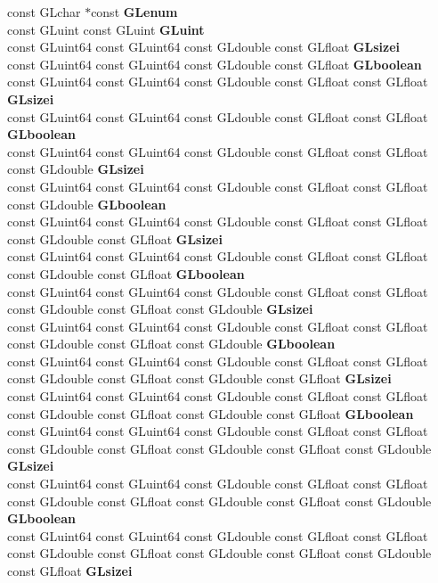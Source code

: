 \begin{DoxyCompactItemize}
\begin{tabbing}
\>const GLchar $\ast$const {\bfseries GLenum}\\
\>const GLuint const GLuint {\bfseries GLuint}\\
\>const GLuint64 const GLuint64 const GLdouble const GLfloat {\bfseries GLsizei}\\
\>const GLuint64 const GLuint64 const GLdouble const GLfloat {\bfseries GLboolean}\\
\>const GLuint64 const GLuint64 const GLdouble const GLfloat const GLfloat {\bfseries GLsizei}\\
\>const GLuint64 const GLuint64 const GLdouble const GLfloat const GLfloat {\bfseries GLboolean}\\
\>const GLuint64 const GLuint64 const GLdouble const GLfloat const GLfloat const GLdouble {\bfseries GLsizei}\\
\>const GLuint64 const GLuint64 const GLdouble const GLfloat const GLfloat const GLdouble {\bfseries GLboolean}\\
\>const GLuint64 const GLuint64 const GLdouble const GLfloat const GLfloat const GLdouble const GLfloat {\bfseries GLsizei}\\
\>const GLuint64 const GLuint64 const GLdouble const GLfloat const GLfloat const GLdouble const GLfloat {\bfseries GLboolean}\\
\>const GLuint64 const GLuint64 const GLdouble const GLfloat const GLfloat const GLdouble const GLfloat const GLdouble {\bfseries GLsizei}\\
\>const GLuint64 const GLuint64 const GLdouble const GLfloat const GLfloat const GLdouble const GLfloat const GLdouble {\bfseries GLboolean}\\
\>const GLuint64 const GLuint64 const GLdouble const GLfloat const GLfloat const GLdouble const GLfloat const GLdouble const GLfloat {\bfseries GLsizei}\\
\>const GLuint64 const GLuint64 const GLdouble const GLfloat const GLfloat const GLdouble const GLfloat const GLdouble const GLfloat {\bfseries GLboolean}\\
\>const GLuint64 const GLuint64 const GLdouble const GLfloat const GLfloat const GLdouble const GLfloat const GLdouble const GLfloat const GLdouble {\bfseries GLsizei}\\
\>const GLuint64 const GLuint64 const GLdouble const GLfloat const GLfloat const GLdouble const GLfloat const GLdouble const GLfloat const GLdouble {\bfseries GLboolean}\\
\>const GLuint64 const GLuint64 const GLdouble const GLfloat const GLfloat const GLdouble const GLfloat const GLdouble const GLfloat const GLdouble const GLfloat {\bfseries GLsizei}\\

\end{tabbing}
\end{DoxyCompactItemize}
